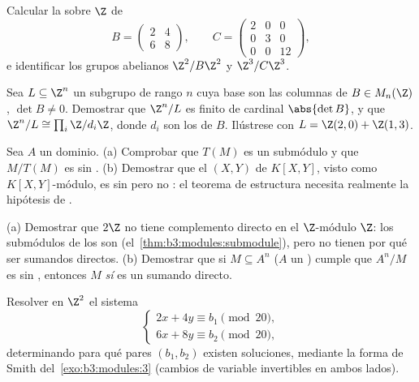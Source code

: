 \begin{exercise}[$\star$]\label{exo:b3:modules:3}
Calcular la  sobre
$\Z$ de
\[
B = \begin{pmatrix} 2 & 4\\ 6 & 8 \end{pmatrix},
\qquad
C = \begin{pmatrix} 2 & 0 & 0\\ 0 & 3 & 0\\ 0 & 0 & 12
\end{pmatrix},
\]
e identificar los grupos abelianos $\Z^2/B\Z^2$ y $\Z^3/C\Z^3$.
\end{exercise}

\begin{exercise}[$\star\star$]\label{exo:b3:modules:4}
Sea $L \subseteq \Z^n$ un subgrupo de rango $n$ cuya base son las
columnas de $B \in M_n(\Z)$, $\det B \neq 0$. Demostrar que $\Z^n/L$ es
finito de cardinal $\abs{\det B}$, y que $\Z^n/L
\cong \prod_i \Z/d_i\Z$, donde $d_i$ son los
 de $B$. Ilústrese
con $L = \Z(2,0) + \Z(1,3)$.
\end{exercise}

\begin{exercise}[$\star\star$]\label{exo:b3:modules:5}
Sea $A$ un dominio. (a) Comprobar que $T(M)$ es un submódulo y que
$M/T(M)$ es sin . (b) Demostrar
que el  $(X, Y)$ de $K[X,Y]$, visto
como $K[X,Y]$-módulo, es sin 
pero no : el teorema de estructura
necesita realmente la hipótesis de .
\end{exercise}

\begin{exercise}[$\star\star$]\label{exo:b3:modules:6}
(a) Demostrar que $2\Z$ no tiene complemento directo en el $\Z$-módulo
$\Z$: los submódulos de los 
son 
(el~\cref{thm:b3:modules:submodule}), pero no tienen por qué ser
sumandos directos. (b) Demostrar que si $M \subseteq A^n$ ($A$ un
) cumple que $A^n/M$ es
sin , entonces $M$ \emph{sí} es
un sumando directo.
\end{exercise}

\begin{exercise}[$\star\star$]\label{exo:b3:modules:7}
Resolver en $\Z^2$ el sistema
\[
\begin{cases}
2x + 4y \equiv b_1 \pmod{20},\\
6x + 8y \equiv b_2 \pmod{20},
\end{cases}
\]
determinando para qué pares $(b_1, b_2)$ existen soluciones, mediante la
forma de Smith del~\cref{exo:b3:modules:3} (cambios de variable
invertibles en ambos lados).
\end{exercise}

